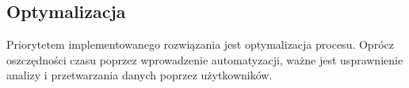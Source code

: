 \subsection{Optymalizacja}
Priorytetem implementowanego rozwiązania jest optymalizacja procesu. Oprócz oszczędności czasu poprzez wprowadzenie automatyzacji, ważne jest usprawnienie analizy i przetwarzania danych poprzez użytkowników. 